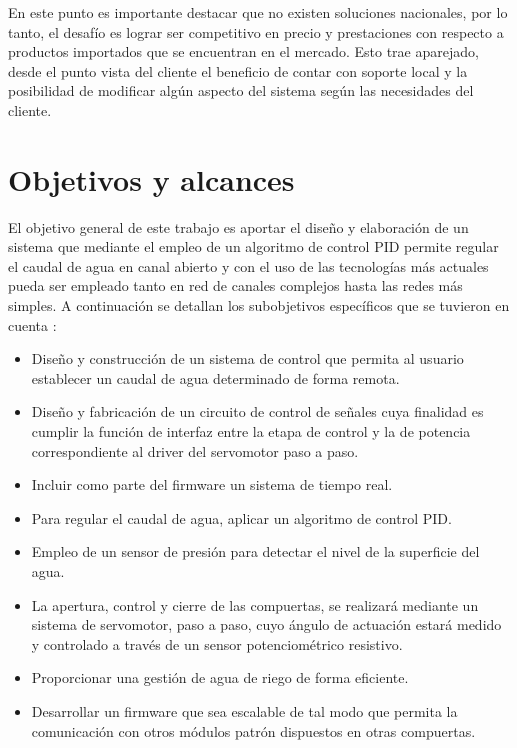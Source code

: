 
En este punto es importante destacar que no existen soluciones nacionales, por lo tanto,  el desafío es lograr ser competitivo en precio y prestaciones con respecto a productos importados que se encuentran en el mercado. Esto trae aparejado, desde el punto vista del cliente el beneficio de contar con soporte local y la posibilidad de modificar algún aspecto del sistema según las necesidades del cliente.

\vspace{2cm}
\section{Objetivos y alcances}


El objetivo general de este trabajo es aportar el diseño y elaboración de un sistema que mediante el empleo de un algoritmo de control PID permite regular el caudal de agua en canal abierto y con el uso de las tecnologías más actuales pueda ser empleado tanto en red de canales complejos hasta las redes más simples. A continuación se detallan los subobjetivos específicos que se tuvieron en cuenta :  
\begin{itemize}
\item Diseño y construcción de  un sistema de control que permita al usuario establecer un caudal de agua determinado de forma remota.

\item Diseño y fabricación de un circuito de control de señales cuya finalidad es cumplir la función de interfaz entre la etapa de control y la de potencia correspondiente al driver del servomotor paso a paso. 
\item Incluir como parte del firmware un sistema de tiempo real.  
\item Para regular el caudal de agua, aplicar un algoritmo de control PID.
\item Empleo de un sensor de presión para detectar el nivel de la superficie del agua.
\item La apertura, control y cierre de las compuertas, se realizará mediante un sistema de servomotor, paso a paso, cuyo ángulo de actuación estará medido y controlado a través de un sensor potenciométrico resistivo.  
\item Proporcionar una gestión de agua de riego de forma eficiente.
\item Desarrollar un firmware que sea escalable de tal modo que permita la comunicación con otros módulos patrón dispuestos en otras compuertas. 
\end{itemize}

